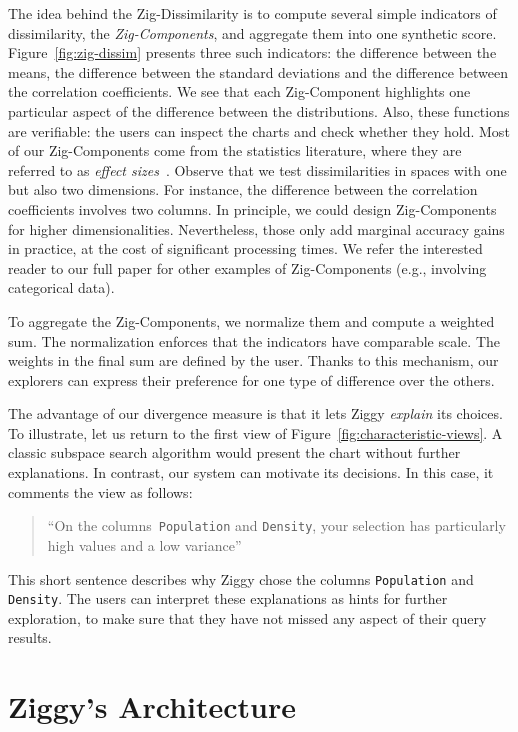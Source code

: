 The idea behind the Zig-Dissimilarity is to compute se\-veral simple
indicators of dissimilarity, the \emph{Zig-Components}, and aggregate them into
one synthetic score.  Figure~\ref{fig:zig-dissim} pre\-sents three such
indicators: the difference between the means, the difference between the
standard deviations and the difference between the correlation coefficients. We
see that each Zig-Component highlights one particular aspect of the
difference between the distributions.  Also, these functions are verifiable:
the users can inspect the charts and check whether they hold.  Most of our
Zig-Components come from the statistics literature, where they are referred to
as \emph{effect sizes}~\cite{hedges2014statistical}. Observe that we test
dissimilarities in spaces with one but also two dimensions. For instance, the
difference between the correlation coefficients involves two columns. In
principle, we could design Zig-Components for higher dimensionalities.
Nevertheless, those only add marginal accuracy gains  in practice, at the cost
of significant processing times. We refer the interested reader to our full
paper for other examples of Zig-Components (e.g., involving categorical data).

To aggregate the Zig-Components, we normalize them and compute a weighted sum.
The normalization enforces that the indicators have comparable scale. The
weights in the final sum are defined by the user. Thanks to this mechanism, our
explorers can express their preference for one type of difference over the
others. 

The advantage of our divergence measure is that it lets Ziggy \emph{explain}
its choices. To illustrate, let us return to the first view of
Figure~\ref{fig:characteristic-views}. A classic subspace search algorithm
would present the chart without further explanations. In contrast, our system
can motivate its decisions. In this case, it comments the view as follows:
\begin{quotation}
    ``On the columns~\texttt{Population} and \texttt{Density}, your selection has
    particularly high values and a low variance''
\end{quotation} 
This short sentence describes why Ziggy chose the columns \texttt{Population}
and \texttt{Density}. The users can interpret these explanations as hints for
further exploration, to make sure that they have not missed any 
aspect of their query results.

\section{Ziggy's Architecture}
\label{sec:solution}

